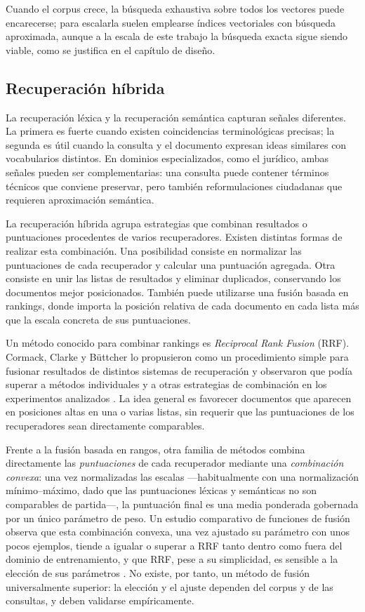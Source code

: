 Cuando el corpus crece, la búsqueda exhaustiva sobre todos los vectores puede encarecerse; para escalarla suelen emplearse índices vectoriales con búsqueda aproximada, aunque a la escala de este trabajo la búsqueda exacta sigue siendo viable, como se justifica en el capítulo de diseño.

\subsection{Recuperación híbrida}
\label{sec:recuperacion-hibrida}

La recuperación léxica y la recuperación semántica capturan señales diferentes. La primera es fuerte cuando existen coincidencias terminológicas precisas; la segunda es útil cuando la consulta y el documento expresan ideas similares con vocabularios distintos. En dominios especializados, como el jurídico, ambas señales pueden ser complementarias: una consulta puede contener términos técnicos que conviene preservar, pero también reformulaciones ciudadanas que requieren aproximación semántica.

La recuperación híbrida agrupa estrategias que combinan resultados o puntuaciones procedentes de varios recuperadores. Existen distintas formas de realizar esta combinación. Una posibilidad consiste en normalizar las puntuaciones de cada recuperador y calcular una puntuación agregada. Otra consiste en unir las listas de resultados y eliminar duplicados, conservando los documentos mejor posicionados. También puede utilizarse una fusión basada en rankings, donde importa la posición relativa de cada documento en cada lista más que la escala concreta de sus puntuaciones.

Un método conocido para combinar rankings es \emph{Reciprocal Rank Fusion} (RRF). Cormack, Clarke y Büttcher lo propusieron como un procedimiento simple para fusionar resultados de distintos sistemas de recuperación y observaron que podía superar a métodos individuales y a otras estrategias de combinación en los experimentos analizados \cite{cormack2009rrf}. La idea general es favorecer documentos que aparecen en posiciones altas en una o varias listas, sin requerir que las puntuaciones de los recuperadores sean directamente comparables.

Frente a la fusión basada en rangos, otra familia de métodos combina directamente las \emph{puntuaciones} de cada recuperador mediante una \emph{combinación convexa}: una vez normalizadas las escalas —habitualmente con una normalización mínimo--máximo, dado que las puntuaciones léxicas y semánticas no son comparables de partida—, la puntuación final es una media ponderada gobernada por un único parámetro de peso. Un estudio comparativo de funciones de fusión observa que esta combinación convexa, una vez ajustado su parámetro con unos pocos ejemplos, tiende a igualar o superar a RRF tanto dentro como fuera del dominio de entrenamiento, y que RRF, pese a su simplicidad, es sensible a la elección de sus parámetros \cite{bruch2023fusion}. No existe, por tanto, un método de fusión universalmente superior: la elección y el ajuste dependen del corpus y de las consultas, y deben validarse empíricamente.

